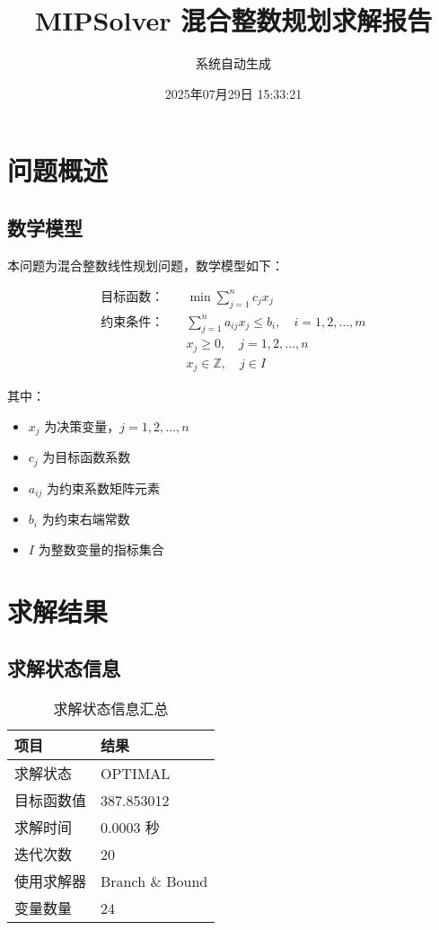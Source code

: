 \documentclass[12pt,a4paper]{article}
\title{\textbf{MIPSolver 混合整数规划求解报告}}
\author{系统自动生成}
\date{2025年07月29日 15:33:21}
\begin{document}
\maketitle
\thispagestyle{fancy}

\tableofcontents
\newpage

\section{问题概述}

\subsection{数学模型}

本问题为混合整数线性规划问题，数学模型如下：

\begin{align}
\text{目标函数：} \quad & \min \sum_{j=1}^{n} c_j x_j \label{eq:objective}\\
\text{约束条件：} \quad & \sum_{j=1}^{n} a_{ij} x_j \leq b_i, \quad i = 1, 2, \ldots, m \label{eq:constraints}\\
& x_j \geq 0, \quad j = 1, 2, \ldots, n \label{eq:nonnegativity}\\
& x_j \in \mathbb{Z}, \quad j \in I \label{eq:integrality}
\end{align}

其中：
\begin{itemize}
\item $x_j$ 为决策变量，$j = 1, 2, \ldots, n$
\item $c_j$ 为目标函数系数
\item $a_{ij}$ 为约束系数矩阵元素
\item $b_i$ 为约束右端常数
\item $I$ 为整数变量的指标集合
\end{itemize}

\section{求解结果}

\subsection{求解状态信息}

\begin{table}[h]
\centering
\begin{tabular}{ll}
\toprule
\textbf{项目} & \textbf{结果} \\
\midrule
求解状态 & OPTIMAL \\
目标函数值 & 387.853012 \\
求解时间 & 0.0003 秒 \\
迭代次数 & 20 \\
使用求解器 & Branch \& Bound \\
变量数量 & 24 \\
\bottomrule
\end{tabular}
\caption{求解状态信息汇总}
\end{table}
\end{document}
